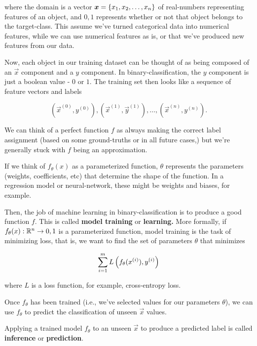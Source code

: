 \documentclass{article}
\begin{document}
where the domain is a \@{vector} $\boldsymbol{x} = \left\{ x_1, x_2, \dots, x_n \right\}$ of \@{real-numbers} representing \@{features} of an object, and ${0,1}$ represents whether or not that object belongs to the \@{target-class}. This assume we've turned \@{categorical} data into numerical features, while we can use numerical features as is, or that we've produced new features from our data.

Now, each object in our training dataset can be thought of as being composed of an $\vec{x}$ component and a $y$ component. In \@{binary-classification}, the $y$ component is just a boolean value - $0$ or $1$. The training set then looks like a \@{sequence} of \@{feature} vectors and \@{labels}

\[ {(\vec{x}^{(0)}, y^{(0)}), (\vec{x}^{(1)}, \vec{y}^{(1)}), \dots, (\vec{x}^{(n)}, y^{(n)})}. \]

We can think of a perfect function $f$ as always making the correct \@{label} assignment (based on some \@{ground-truths} or in all future cases,) but we're generally stuck with $f$ being an approximation.

If we think of $f_\theta(x)$ as a parameterized function, $\theta$ represents the parameters (weights, coefficients, etc) that determine the shape of the function. In a regression model or \@{neural-network}, these might be weights and biases, for example.

\begin{definition}
Then, the job of machine learning in \@{binary-classification} is to produce a good function $f.$ This is called \textbf{model training} or \textbf{learning.} More formally, if $f_\theta(x) : \mathbb{R}^n \to {0,1}$ is a parameterized function, model training is the task of minimizing loss, that is, we want to find the set of parameters $\theta$ that minimizes

\[ \sum_{i=1}^m L \left(f_\theta(x^{(i)}), y^{(i)}\right) \]

where $L$ is a loss function, for example, \@{cross-entropy} loss.
\end{definition}

Once $f_\theta$ has been trained (i.e., we've selected values for our parameters $\theta$), we can use $f_\theta$ to predict the classification of unseen $\vec{x}$ values.

\begin{definition}[Inference]
Applying a trained model $f_\theta$ to an unseen $\vec{x}$ to produce a predicted \@{label} is called \textbf{inference} or \textbf{prediction}.
\end{definition}
\end{document}
